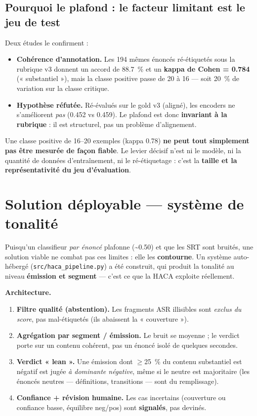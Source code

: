 \documentclass[11pt, a4paper]{article}
\begin{document}
\subsection{Pourquoi le plafond : le facteur limitant est le jeu de test}

Deux études le confirment :
\begin{itemize}[leftmargin=1.2em, itemsep=2pt]
  \item \textbf{Cohérence d'annotation.} Les 194 mêmes énoncés ré-étiquetés sous
  la rubrique v3 donnent un accord de 88.7~\% et un \textbf{kappa de Cohen = 0.784}
  (« substantiel »), mais la classe positive passe de 20 à 16 — soit 20~\% de
  variation sur la classe critique.
  \item \textbf{Hypothèse réfutée.} Ré-évalués sur le gold v3 (aligné),
  les encoders ne s'améliorent \emph{pas} (0.452 vs 0.459). Le plafond est donc
  \textbf{invariant à la rubrique} : il est structurel, pas un problème d'alignement.
\end{itemize}

Une classe positive de 16--20 exemples (kappa 0.78) \textbf{ne peut tout simplement
pas être mesurée de façon fiable}. Le levier décisif n'est ni le modèle, ni la
quantité de données d'entraînement, ni le ré-étiquetage : c'est la \textbf{taille
et la représentativité du jeu d'évaluation}.

\section{Solution déployable — système de tonalité}

Puisqu'un classifieur \emph{par énoncé} plafonne (\textasciitilde0.50) et que les SRT
sont bruités, une solution viable ne combat pas ces limites : elle les \textbf{contourne}.
Un système auto-hébergé (\texttt{src/haca\_pipeline.py}) a été construit, qui produit la
tonalité au niveau \textbf{émission et segment} — c'est ce que la HACA exploite réellement.

\textbf{Architecture.}
\begin{enumerate}[leftmargin=1.4em, itemsep=1pt]
  \item \textbf{Filtre qualité (abstention).} Les fragments ASR illisibles sont
  \emph{exclus du score}, pas mal-étiquetés (ils abaissent la « couverture »).
  \item \textbf{Agrégation par segment / émission.} Le bruit se moyenne ; le verdict
  porte sur un contenu cohérent, pas un énoncé isolé de quelques secondes.
  \item \textbf{Verdict « lean ».} Une émission dont $\geq$25~\% du contenu substantiel
  est négatif est jugée \emph{à dominante négative}, même si le neutre est majoritaire
  (les énoncés neutres — définitions, transitions — sont du remplissage).
  \item \textbf{Confiance + révision humaine.} Les cas incertains (couverture ou
  confiance basse, équilibre neg/pos) sont \textbf{signalés}, pas devinés.
\end{enumerate}
\end{document}
